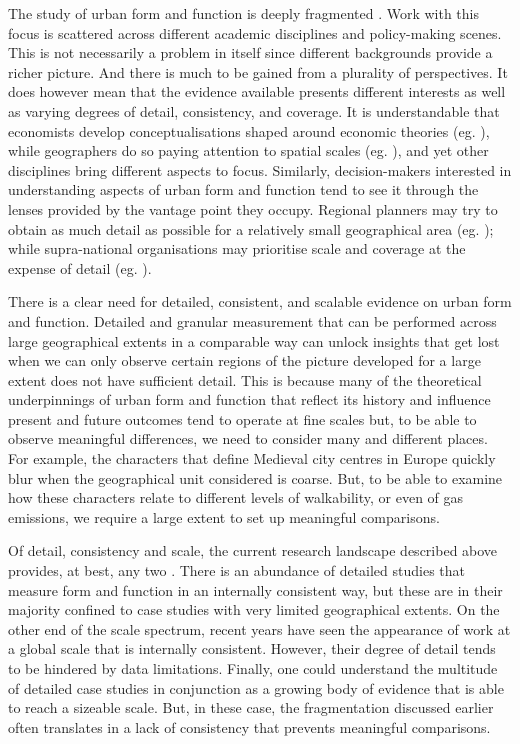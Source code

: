 The study of urban form and function is deeply fragmented
\citep{kropf2014ambiguity,brenner2015towards,gauthier2006mapping}.
Work with this focus is scattered across
different academic disciplines and policy-making scenes. This is not
necessarily a problem in itself since different backgrounds
provide a richer picture. And there is much to be gained from a plurality of
perspectives.
%
It does however mean that the evidence available presents different
interests as well as varying degrees of detail, consistency, and coverage.
It is understandable that economists develop conceptualisations shaped around
economic theories (eg. \citealp{ahlfeldt2019}), while geographers do so paying attention
to spatial scales (eg. \citealp{boeing2018}),
and yet other disciplines bring different aspects to focus.
Similarly, decision-makers interested in understanding aspects of urban form
and function tend to see it through the lenses provided by the vantage point
they occupy. Regional planners may try to obtain as much detail as
possible for a relatively small geographical area (eg. \citealp{bcnnight});
while supra-national organisations may prioritise scale and coverage
at the expense of detail (eg. \citealp{eea2016}).

There is a clear need for detailed, consistent, and scalable evidence on urban
form and function.
Detailed and granular measurement that can be performed across large
geographical extents in a comparable way can unlock insights that get lost
when we can only observe certain regions of the picture developed for a large
extent does not have sufficient detail.
%
This is because many of the
theoretical underpinnings of urban form and function that reflect its history
and influence present and future outcomes tend to operate at fine scales but,
to be able to observe meaningful differences, we need to consider many and
different places.
%
For example, the characters that define Medieval city centres in Europe
quickly blur when the geographical unit considered is coarse. But, to be able to
examine how these characters relate to different levels of walkability, or
even of gas emissions, we require a large extent to set up meaningful
comparisons.

Of detail, consistency and scale, the current research landscape described above
provides, at best, any two \citep{jochem2020,araldi2019,fleischmann2021methodological}.
%
There is an abundance of detailed studies that measure form and
function in an internally consistent way, but these are in their majority confined to
case studies with very limited geographical extents.
%
On the other end of the scale spectrum, recent years have seen the appearance
of work at a global scale that is internally consistent. However, their degree of detail
tends to be hindered by data limitations.
%
Finally, one could understand the multitude of detailed case studies in
conjunction as a growing body of evidence that is able to reach a sizeable
scale. But, in these case, the fragmentation discussed earlier often
translates in a lack of consistency that prevents meaningful comparisons.


